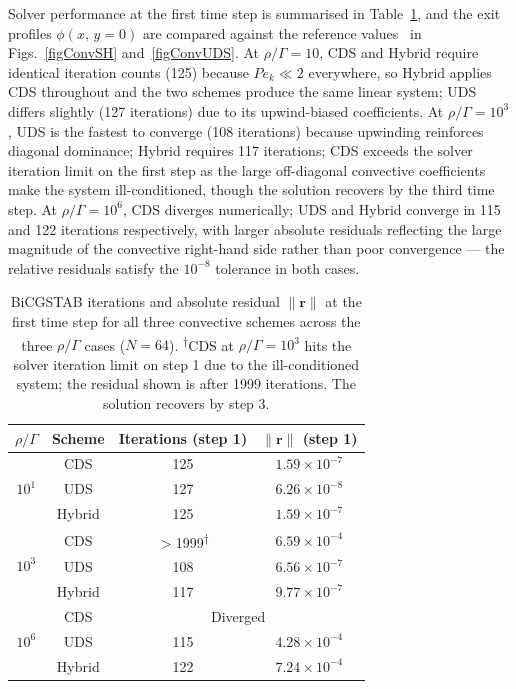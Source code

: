 Solver performance at the first time step is summarised in Table~\ref{tabConvSHResults}, and the exit profiles $\phi(x,\, y=0)$ are compared against the reference values~\cite{SmithHutton1982} in Figs.~\ref{figConvSH} and~\ref{figConvUDS}. At $\rho/\Gamma = 10$, CDS and Hybrid require identical iteration counts (125) because $Pe_k \ll 2$ everywhere, so Hybrid applies CDS throughout and the two schemes produce the same linear system; UDS differs slightly (127 iterations) due to its upwind-biased coefficients. At $\rho/\Gamma = 10^3$, UDS is the fastest to converge (108 iterations) because upwinding reinforces diagonal dominance; Hybrid requires 117 iterations; CDS exceeds the solver iteration limit on the first step as the large off-diagonal convective coefficients make the system ill-conditioned, though the solution recovers by the third time step. At $\rho/\Gamma = 10^6$, CDS diverges numerically; UDS and Hybrid converge in 115 and 122 iterations respectively, with larger absolute residuals reflecting the large magnitude of the convective right-hand side rather than poor convergence — the relative residuals satisfy the $10^{-8}$ tolerance in both cases.

\begin{table}[ht]
    \centering
    \begin{tabular}{|c|c|c|c|}
        \hline
        $\rho/\Gamma$ & Scheme & Iterations (step 1) & $\|\mathbf{r}\|$ (step 1) \\
        \hline
        \multirow{3}{*}{$10^1$} & CDS    & 125 & $1.59\times10^{-7}$ \\
                                & UDS    & 127 & $6.26\times10^{-8}$ \\
                                & Hybrid & 125 & $1.59\times10^{-7}$ \\
        \hline
        \multirow{3}{*}{$10^3$} & CDS    & $>$1999\textsuperscript{$\dagger$} & $6.59\times10^{-4}$ \\
                                & UDS    & 108 & $6.56\times10^{-7}$ \\
                                & Hybrid & 117 & $9.77\times10^{-7}$ \\
        \hline
        \multirow{3}{*}{$10^6$} & CDS    & \multicolumn{2}{c|}{Diverged} \\
                                & UDS    & 115 & $4.28\times10^{-4}$ \\
                                & Hybrid & 122 & $7.24\times10^{-4}$ \\
        \hline
    \end{tabular}
    \caption{BiCGSTAB iterations and absolute residual $\|\mathbf{r}\|$ at the first time step for all three convective schemes across the three $\rho/\Gamma$ cases ($N = 64$). \textsuperscript{$\dagger$}CDS at $\rho/\Gamma = 10^3$ hits the solver iteration limit on step 1 due to the ill-conditioned system; the residual shown is after 1999 iterations. The solution recovers by step 3.}
    \label{tabConvSHResults}
\end{table}

